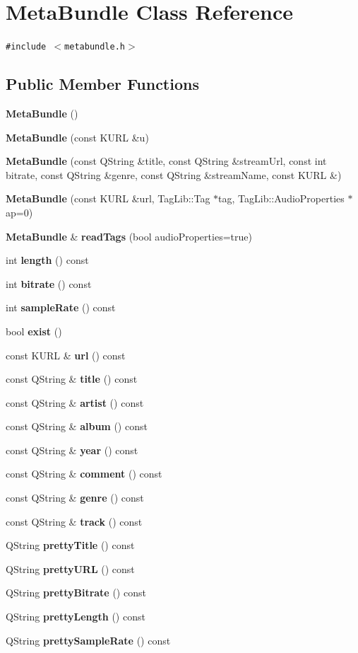 \section{Meta\-Bundle Class Reference}
\label{classMetaBundle}
{\tt \#include $<$metabundle.h$>$}

\subsection*{Public Member Functions}
\begin{CompactItemize}
\item 
{\bf Meta\-Bundle} ()
\item 
{\bf Meta\-Bundle} (const KURL \&u)
\item 
{\bf Meta\-Bundle} (const QString \&title, const QString \&stream\-Url, const int bitrate, const QString \&genre, const QString \&stream\-Name, const KURL \&)
\item 
{\bf Meta\-Bundle} (const KURL \&url, Tag\-Lib::Tag $\ast$tag, Tag\-Lib::Audio\-Properties $\ast$ap=0)
\item 
{\bf Meta\-Bundle} \& {\bf read\-Tags} (bool audio\-Properties=true)
\item 
int {\bf length} () const 
\item 
int {\bf bitrate} () const 
\item 
int {\bf sample\-Rate} () const 
\item 
bool {\bf exist} ()
\item 
const KURL \& {\bf url} () const 
\item 
const QString \& {\bf title} () const 
\item 
const QString \& {\bf artist} () const 
\item 
const QString \& {\bf album} () const 
\item 
const QString \& {\bf year} () const 
\item 
const QString \& {\bf comment} () const 
\item 
const QString \& {\bf genre} () const 
\item 
const QString \& {\bf track} () const 
\item 
QString {\bf pretty\-Title} () const 
\item 
QString {\bf pretty\-URL} () const 
\item 
QString {\bf pretty\-Bitrate} () const 
\item 
QString {\bf pretty\-Length} () const 
\item 
QString {\bf pretty\-Sample\-Rate} () const 
\end{CompactItemize}
